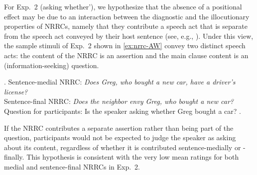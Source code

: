\documentclass[times,linguex]{glossa}
\begin{document}
For Exp.~2 (asking whether'), we hypothesize that the absence of a positional effect may be due to an interaction between the diagnostic and the illocutionary properties of NRRCs, namely that they contribute a speech act that is separate from the speech act conveyed by their host sentence (see, e.g., \citealt{potts_logic_2005,koev_apposition_2013,syrett_experimental_2015}). Under this view, the sample stimuli of Exp.~2 shown  in \ref{ex:nrrc-AW} convey two distinct speech acts: the content of the NRRC is an assertion and the main clause content is an (information-seeking) question.

\ex.\label{ex:nrrc-AW} Sentence-medial NRRC: \hfill \emph{Does Greg, who bought a new car, have a driver's license?}
\\ Sentence-final NRRC: \hfill  \emph{Does the neighbor envy Greg, who bought a new car?}\smallskip
\\ Question for participants: Is the speaker asking whether Greg bought a car?
\z.

If the  NRRC contributes a separate assertion rather than being part of the question, participants would not be expected to judge the speaker as asking about its content, regardless of whether it is contributed sentence-medially or -finally. This hypothesis is consistent with the very low mean ratings for both medial and sentence-final NRRCs in Exp.~2. %
\end{document}
